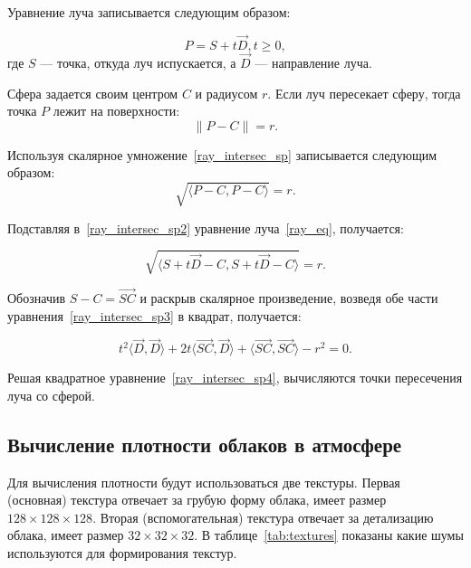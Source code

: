 Уравнение луча записывается следующим образом:

\begin{equation}
	\label{ray_eq}
	P = S + t \vec{D}, t \ge 0,
\end{equation}
где $ S $ --- точка, откуда луч испускается, а $ \vec{D} $ --- направление луча.

Сфера задается своим центром $ C $ и радиусом $ r $. Если луч пересекает сферу, тогда точка $ P $ лежит на поверхности:
\begin{equation}
	\label{ray_intersec_sp}
	\| P - C \| = r.
\end{equation}

Используя скалярное умножение~\eqref{ray_intersec_sp} записывается следующим образом:
\begin{equation}
	\label{ray_intersec_sp2}
	\sqrt{\langle P - C , P - C \rangle} = r.
\end{equation}

Подставляя в~\eqref{ray_intersec_sp2} уравнение луча~\eqref{ray_eq}, получается:

\begin{equation}
	\label{ray_intersec_sp3}
	\sqrt{\langle S + t \vec{D} - C , S + t \vec{D} - C \rangle} = r.
\end{equation}

Обозначив $ S - C = \vec{SC} $ и раскрыв скалярное произведение, возведя обе части уравнения~\eqref{ray_intersec_sp3} в квадрат, получается:

\begin{equation}
	\label{ray_intersec_sp4}
	t ^ 2 \langle \vec{D}, \vec{D} \rangle + 2t \langle \vec{SC}, \vec{D} \rangle + \langle \vec{SC}, \vec{SC} \rangle - r ^ 2 = 0.
\end{equation}

Решая квадратное уравнение~\eqref{ray_intersec_sp4}, вычисляются точки пересечения луча со сферой.

\subsection{Вычисление плотности облаков в атмосфере}

Для вычисления плотности будут использоваться две текстуры.
Первая (основная) текстура отвечает за грубую форму облака, имеет размер $ 128 \times 128 \times 128 $. Вторая (вспомогательная) текстура отвечает за детализацию облака, имеет размер $ 32 \times 32 \times 32$. 
В таблице~\ref{tab:textures} показаны какие шумы используются для формирования текстур.


